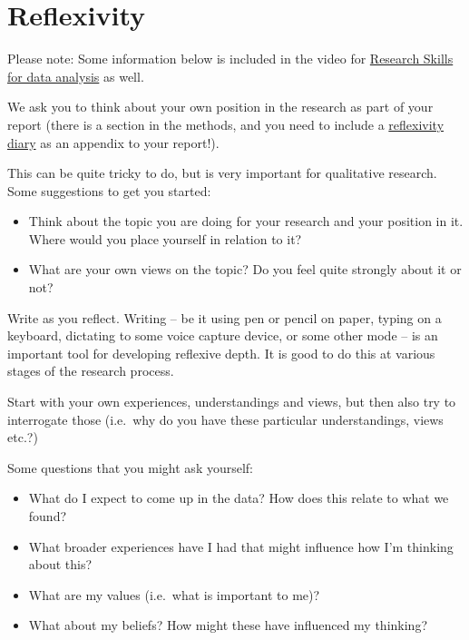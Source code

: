 \documentclass[
  english,
  letterpaper,
  DIV=11,
  numbers=noendperiod]{scrreprt}
\providecommand{\tightlist}{%
  \setlength{\itemsep}{0pt}\setlength{\parskip}{0pt}}
\begin{document}
\section{Reflexivity}\label{reflexivity}

Please note: Some information below is included in the video for
\hyperref[reflexivity_skills_session]{Research Skills for data analysis}
as well.

We ask you to think about your own position in the research as part of
your report (there is a section in the methods, and you need to include
a
\href{https://gla-my.sharepoint.com/:w:/g/personal/ashley_robertson_glasgow_ac_uk/IQC1PIxhBlndR74S_nfeKHNlAW5uQmGOpoRXCpLHC2fI_fI?e=aunShJ}{reflexivity
diary} as an appendix to your report!).

This can be quite tricky to do, but is very important for qualitative
research. Some suggestions to get you started:

\begin{itemize}
\tightlist
\item
  Think about the topic you are doing for your research and your
  position in it. Where would you place yourself in relation to it?
\item
  What are your own views on the topic? Do you feel quite strongly about
  it or not?
\end{itemize}

Write as you reflect. Writing -- be it using pen or pencil on paper,
typing on a keyboard, dictating to some voice capture device, or some
other mode -- is an important tool for developing reflexive depth. It is
good to do this at various stages of the research process.

Start with your own experiences, understandings and views, but then also
try to interrogate those (i.e.~why do you have these particular
understandings, views etc.?)

Some questions that you might ask yourself:

\begin{itemize}
\tightlist
\item
  What do I expect to come up in the data? How does this relate to what
  we found?
\item
  What broader experiences have I had that might influence how I'm
  thinking about this?
\item
  What are my values (i.e.~what is important to me)?
\item
  What about my beliefs? How might these have influenced my thinking?
\end{itemize}
\end{document}
